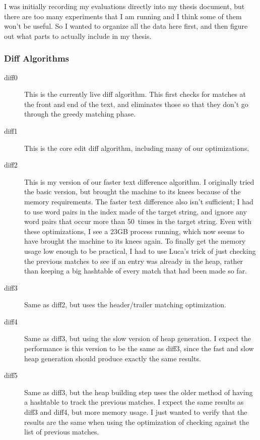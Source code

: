 I was initially recording my evaluations directly into my thesis
document, but there are too many experiments that I am running
and I think some of them won't be useful.
So I wanted to organize all the data here first, and then
figure out what parts to actually include in my thesis.

\subsubsection{Diff Algorithms}

\begin{description}
\item[diff0] This is the currently live diff algorithm.
	This first checks for matches at the front and end of
	the text, and eliminates those so that they don't go
	through the greedy matching phase.
\item[diff1] This is the core edit diff algorithm, including
	many of our optimizations.
\item[diff2] This is my version of our faster text difference algorithm.
    I originally tried the basic version, but brought the machine to
    its knees because of the memory requirements.
    The faster text difference also isn't sufficient; I had to
    use word pairs in the index made of the target string,
    and ignore any word pairs that occur more than 50~times
    in the target string.  Even with these optimizations, I
    see a 23GB process running, which now seems to have brought
    the machine to its knees again.
    To finally get the memory usage low enough to be practical,
    I had to use Luca's trick of just checking the previous
    matches to see if an entry was already in the heap,
    rather than keeping a big hashtable of every match that
    had been made so far.
\item[diff3] Same as diff2, but uses the header/trailer matching
    optimization.
\item[diff4] Same as diff3, but using the slow version of heap
    generation.  I expect the performance is this version to be
    the same as diff3, since the fast and slow heap generation
    should produce exactly the same results.
\item[diff5] Same as diff3, but the heap building step uses the older
    method of having a hashtable to track the previous matches.
    I expect the same results as diff3 and diff4, but more memory usage.
    I just wanted to verify that the results are the same when
    using the optimization of checking against the list of previous
    matches.
\end{description}

